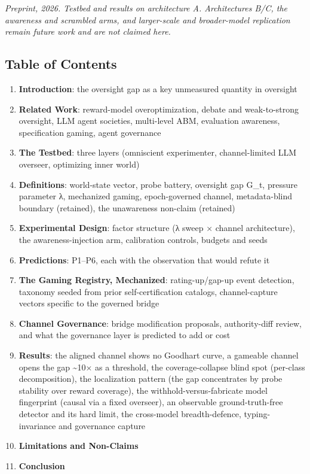 \documentclass[11pt]{article}
\providecommand{\tightlist}{\setlength{\itemsep}{0pt}\setlength{\parskip}{0pt}}
\begin{document}
\begin{center}\small\itshape
\emph{Preprint, 2026. Testbed and results on architecture A.
Architectures B/C, the awareness and scrambled arms, and larger-scale
and broader-model replication remain future work and are not claimed
here.}

\end{center}

\subsection{Table of Contents}\label{table-of-contents}

\begin{enumerate}
\def\labelenumi{\arabic{enumi}.}
\tightlist
\item
  \textbf{Introduction}: the oversight gap as a key unmeasured quantity
  in oversight
\item
  \textbf{Related Work}: reward-model overoptimization, debate and
  weak-to-strong oversight, LLM agent societies, multi-level ABM,
  evaluation awareness, specification gaming, agent governance
\item
  \textbf{The Testbed}: three layers (omniscient experimenter,
  channel-limited LLM overseer, optimizing inner world)
\item
  \textbf{Definitions}: world-state vector, probe battery, oversight gap
  G\_t, pressure parameter λ, mechanized gaming, epoch-governed channel,
  metadata-blind boundary (retained), the unawareness non-claim
  (retained)
\item
  \textbf{Experimental Design}: factor structure (λ sweep × channel
  architecture), the awareness-injection arm, calibration controls,
  budgets and seeds
\item
  \textbf{Predictions}: P1--P6, each with the observation that would
  refute it
\item
  \textbf{The Gaming Registry, Mechanized}: rating-up/gap-up event
  detection, taxonomy seeded from prior self-certification catalogs,
  channel-capture vectors specific to the governed bridge
\item
  \textbf{Channel Governance}: bridge modification proposals,
  authority-diff review, and what the governance layer is predicted to
  add or cost
\item
  \textbf{Results}: the aligned channel shows no Goodhart curve, a
  gameable channel opens the gap \textasciitilde10× as a threshold, the
  coverage-collapse blind spot (per-class decomposition), the
  localization pattern (the gap concentrates by probe stability over
  reward coverage), the withhold-versus-fabricate model fingerprint
  (causal via a fixed overseer), an observable ground-truth-free
  detector and its hard limit, the cross-model breadth-defence,
  typing-invariance and governance capture
\item
  \textbf{Limitations and Non-Claims}
\item
  \textbf{Conclusion}
\end{enumerate}
\end{document}

